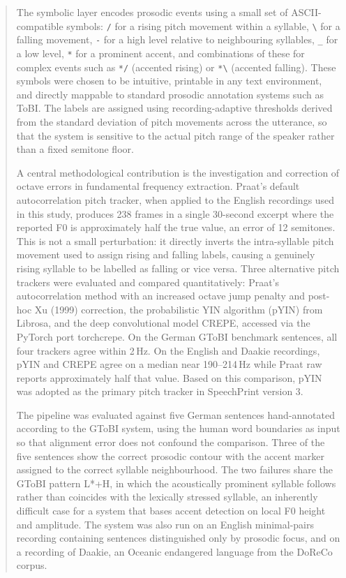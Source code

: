 \begin{abstract}
The symbolic layer encodes prosodic events using a small set of ASCII-compatible symbols: \texttt{/} for a rising pitch movement within a syllable, \texttt{\textbackslash} for a falling movement, \texttt{-} for a high level relative to neighbouring syllables, \texttt{\_} for a low level, \texttt{*} for a prominent accent, and combinations of these for complex events such as \texttt{*/} (accented rising) or \texttt{*\textbackslash} (accented falling). These symbols were chosen to be intuitive, printable in any text environment, and directly mappable to standard prosodic annotation systems such as ToBI. The labels are assigned using recording-adaptive thresholds derived from the standard deviation of pitch movements across the utterance, so that the system is sensitive to the actual pitch range of the speaker rather than a fixed semitone floor.

A central methodological contribution is the investigation and correction of octave errors in fundamental frequency extraction. Praat's default autocorrelation pitch tracker, when applied to the English recordings used in this study, produces 238 frames in a single 30-second excerpt where the reported F0 is approximately half the true value, an error of 12 semitones. This is not a small perturbation: it directly inverts the intra-syllable pitch movement used to assign rising and falling labels, causing a genuinely rising syllable to be labelled as falling or vice versa. Three alternative pitch trackers were evaluated and compared quantitatively: Praat's autocorrelation method with an increased octave jump penalty and post-hoc Xu (1999) correction, the probabilistic YIN algorithm (pYIN) from Librosa, and the deep convolutional model CREPE, accessed via the PyTorch port torchcrepe. On the German GToBI benchmark sentences, all four trackers agree within 2\,Hz. On the English and Daakie recordings, pYIN and CREPE agree on a median near 190--214\,Hz while Praat raw reports approximately half that value. Based on this comparison, pYIN was adopted as the primary pitch tracker in SpeechPrint version 3.

The pipeline was evaluated against five German sentences hand-annotated according to the GToBI system, using the human word boundaries as input so that alignment error does not confound the comparison. Three of the five sentences show the correct prosodic contour with the accent marker assigned to the correct syllable neighbourhood. The two failures share the GToBI pattern L*+H, in which the acoustically prominent syllable follows rather than coincides with the lexically stressed syllable, an inherently difficult case for a system that bases accent detection on local F0 height and amplitude. The system was also run on an English minimal-pairs recording containing sentences distinguished only by prosodic focus, and on a recording of Daakie, an Oceanic endangered language from the DoReCo corpus.


\end{abstract}
